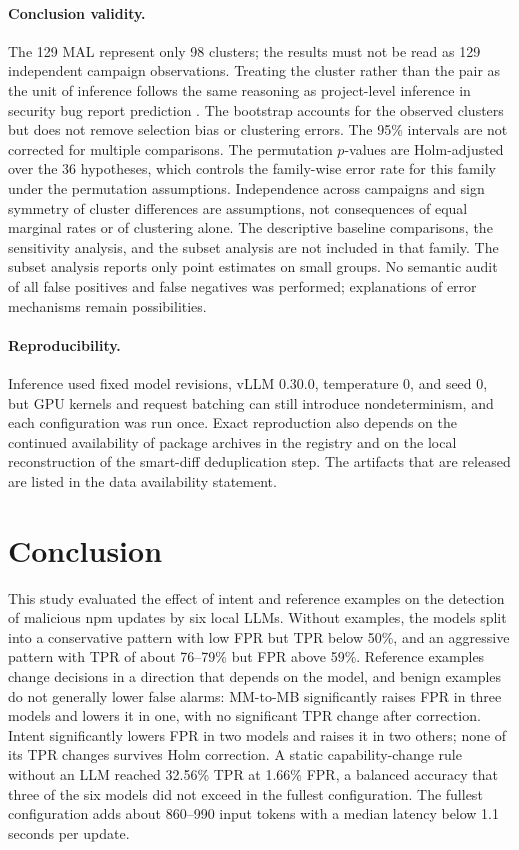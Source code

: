 \documentclass[a4paper,fleqn]{cas-dc}
\begin{document}
\paragraph{Conclusion validity.}
The 129 MAL represent only 98 clusters; the results must not be read as 129
independent campaign observations. Treating the cluster rather than the pair as
the unit of inference follows the same reasoning as project-level inference in
security bug report prediction \citep{jamwal2027llmsec}. The bootstrap accounts for the observed
clusters but does not remove selection bias or clustering errors. The 95\%
intervals are not corrected for multiple comparisons. The permutation
$p$-values are Holm-adjusted over the 36 hypotheses, which controls the
family-wise error rate for this family under the permutation assumptions.
Independence across campaigns and sign symmetry of cluster differences are
assumptions, not consequences of equal marginal rates or of clustering alone.
The descriptive baseline
comparisons, the sensitivity analysis, and the subset analysis are not
included in that family.  The subset analysis reports
only point estimates on small groups. No semantic audit of all false positives and
false negatives was performed; explanations of error mechanisms remain
possibilities.

\paragraph{Reproducibility.}
Inference used fixed model revisions, vLLM 0.30.0, temperature 0, and seed 0, but
GPU kernels and request batching can still introduce nondeterminism, and each
configuration was run once. Exact reproduction also depends on the continued
availability of package archives in the registry and on the local reconstruction
of the smart-diff deduplication step. The artifacts that are released are listed
in the data availability statement.

\section{Conclusion}\label{sec:conclusion}
This study evaluated the effect of intent and reference examples on the detection
of malicious npm updates by six local LLMs. Without examples, the models split
into a conservative pattern with low FPR but TPR below 50\%, and an aggressive
pattern with TPR of about 76--79\% but FPR above 59\%. Reference examples change
decisions in a direction that depends on the model, and benign examples do not
generally lower false alarms: MM-to-MB significantly raises FPR in three
models and lowers it in one, with no significant TPR change after correction.
Intent significantly lowers FPR in two models and raises it in two others;
none of its TPR changes survives Holm correction. A static capability-change
rule without an LLM reached 32.56\% TPR at 1.66\% FPR, a balanced accuracy that
three of the six models did not exceed in the fullest configuration. The fullest
configuration adds about 860--990 input tokens with a median latency below 1.1
seconds per update.
\end{document}
